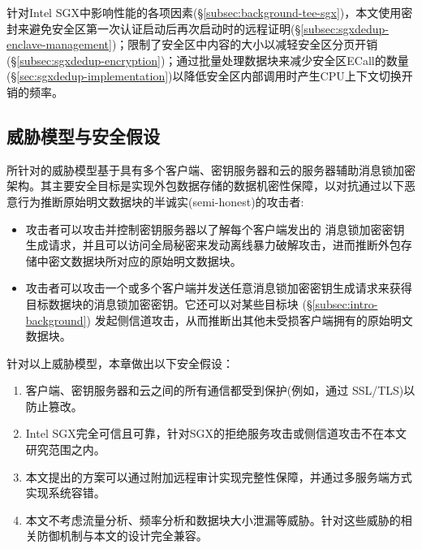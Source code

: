 针对Intel SGX中影响性能的各项因素(\S\ref{subsec:background-tee-sgx})，本文使用密封来避免安全区第一次认证启动后再次启动时的远程证明(\S\ref{subsec:sgxdedup-enclave-management})；限制了安全区中内容的大小以减轻安全区分页开销(\S\ref{subsec:sgxdedup-encryption})；通过批量处理数据块来减少安全区ECall的数量(\S\ref{sec:sgxdedup-implementation})以降低安全区内部调用时产生CPU上下文切换开销的频率。

\subsection{威胁模型与安全假设}
\label{subsec:sgxdedup-threat}

\sysnameS 所针对的威胁模型基于具有多个客户端、密钥服务器和云的服务器辅助消息锁加密架构\cite{bellare2013DupLESS}。其主要安全目标是实现外包数据存储\cite{bellare2013DupLESS}的数据机密性保障，以对抗通过以下恶意行为推断原始明文数据块的半诚实(semi-honest)的攻击者:

\begin{itemize}[leftmargin=*]
    \item 攻击者可以攻击并控制密钥服务器以了解每个客户端发出的 消息锁加密密钥生成请求，并且可以访问全局秘密来发动离线暴力破解攻击\cite{bellare2013DupLESS}，进而推断外包存储中密文数据块所对应的原始明文数据块。
    \item 攻击者可以攻击一个或多个客户端并发送任意消息锁加密密钥生成请求来获得目标数据块的消息锁加密密钥\cite{bellare2013DupLESS}。它还可以对某些目标块 \cite{harnik2010side} (\S\ref{subsec:intro-background}) 发起侧信道攻击，从而推断出其他未受损客户端拥有的原始明文数据块。
\end{itemize}

针对以上威胁模型，本章做出以下安全假设：

\begin{enumerate}[leftmargin=*]
    \item 客户端、密钥服务器和云之间的所有通信都受到保护(例如，通过 SSL/TLS)以防止篡改。
    \item Intel SGX完全可信且可靠，针对SGX的拒绝服务攻击或侧信道攻击\cite{bulck2018FORESHADOW, oleksenko18}不在本文研究范围之内。
    \item 本文提出的方案可以通过附加远程审计\cite{ateniese2007provable, juels2007pors}实现完整性保障，并通过多服务端方式\cite{li15}实现系统容错。
    \item 本文不考虑流量分析\cite{zuo2018mitigating}、频率分析\cite{li2020TED}和数据块大小泄漏\cite{ritzdorf16}等威胁。针对这些威胁的相关防御机制\cite{zuo2018mitigating,li2020TED,ritzdorf16}与本文的设计完全兼容。
\end{enumerate}
